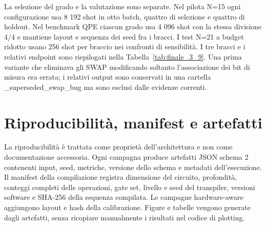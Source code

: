 La selezione del grado e la valutazione sono separate. Nel pilota N=15 ogni configurazione usa 8 192 shot in otto batch, quattro di selezione e quattro di holdout. Nel benchmark QPE ciascun grado usa 4 096 shot con la stessa divisione 4/4 e mantiene layout e sequenza dei seed fra i bracci. I test N=21 a budget ridotto usano 256 shot per braccio nei confronti di sensibilità. I tre bracci e i relativi endpoint sono riepilogati nella Tabella~\ref{tab:finale_3_9}. Una prima variante che eliminava gli SWAP modificando soltanto l'associazione dei bit di misura era errata; i relativi output sono conservati in una cartella \_superseded\_swap\_bug ma sono esclusi dalle evidenze correnti.


\section{Riproducibilità, manifest e artefatti}\label{sec:finale_4_8}

La riproducibilità è trattata come proprietà dell'architettura e non come documentazione accessoria. Ogni campagna produce artefatti JSON schema 2 contenenti input, seed, metriche, versione dello schema e metadati dell'esecuzione. Il manifest della compilazione registra dimensione del circuito, profondità, conteggi completi delle operazioni, gate set, livello e seed del transpiler, versioni software e SHA-256 della sequenza compilata. Le campagne hardware-aware aggiungono layout e hash della calibrazione. Figure e tabelle vengono generate dagli artefatti, senza ricopiare manualmente i risultati nel codice di plotting.

